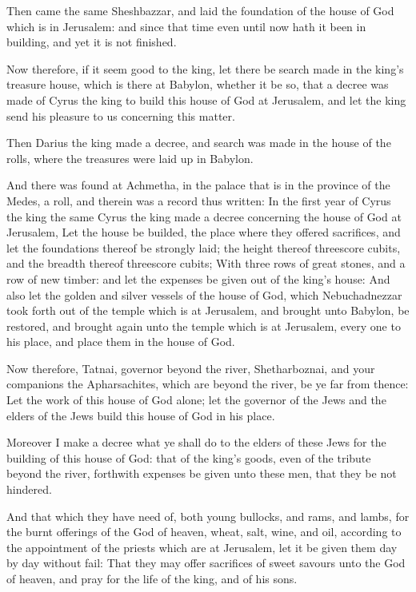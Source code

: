 \Verse Then came the same Sheshbazzar, and laid the foundation of the house of God which is in Jerusalem: and since that time even until now hath it been in building, and yet it is not finished.

\Verse Now therefore, if it seem good to the king, let there be search made in the king's treasure house, which is there at Babylon, whether it be so, that a decree was made of Cyrus the king to build this house of God at Jerusalem, and let the king send his pleasure to us concerning this matter.


\Chapter
\Verse Then Darius the king made a decree, and search was made in the house of the rolls, where the treasures were laid up in Babylon.

\Verse And there was found at Achmetha, in the palace that is in the province of the Medes, a roll, and therein was a record thus written: \Verse In the first year of Cyrus the king the same Cyrus the king made a decree concerning the house of God at Jerusalem, Let the house be builded, the place where they offered sacrifices, and let the foundations thereof be strongly laid; the height thereof threescore cubits, and the breadth thereof threescore cubits; \Verse With three rows of great stones, and a row of new timber: and let the expenses be given out of the king's house: \Verse And also let the golden and silver vessels of the house of God, which Nebuchadnezzar took forth out of the temple which is at Jerusalem, and brought unto Babylon, be restored, and brought again unto the temple which is at Jerusalem, every one to his place, and place them in the house of God.

\Verse Now therefore, Tatnai, governor beyond the river, Shetharboznai, and your companions the Apharsachites, which are beyond the river, be ye far from thence: \Verse Let the work of this house of God alone; let the governor of the Jews and the elders of the Jews build this house of God in his place.

\Verse Moreover I make a decree what ye shall do to the elders of these Jews for the building of this house of God: that of the king's goods, even of the tribute beyond the river, forthwith expenses be given unto these men, that they be not hindered.

\Verse And that which they have need of, both young bullocks, and rams, and lambs, for the burnt offerings of the God of heaven, wheat, salt, wine, and oil, according to the appointment of the priests which are at Jerusalem, let it be given them day by day without fail: \Verse That they may offer sacrifices of sweet savours unto the God of heaven, and pray for the life of the king, and of his sons.

